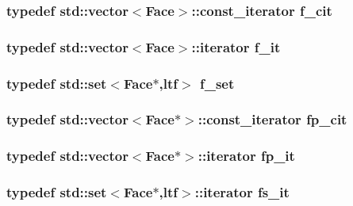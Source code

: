 \subsubsection{\setlength{\rightskip}{0pt plus 5cm}typedef std::vector$<${\bf Face}$>$::const\_\-iterator {\bf f\_\-cit}}\label{meshmorph_8h_1bdf0f72f7c8cbe704a0f6b64be07f6b}


\subsubsection{\setlength{\rightskip}{0pt plus 5cm}typedef std::vector$<${\bf Face}$>$::iterator {\bf f\_\-it}}\label{meshmorph_8h_a19fd10324725dd9216be23ee875011e}


\subsubsection{\setlength{\rightskip}{0pt plus 5cm}typedef std::set$<${\bf Face}$\ast$,{\bf ltf}$>$ {\bf f\_\-set}}\label{meshmorph_8h_18c3a5c9149f71028e8356a5f59979c1}


\subsubsection{\setlength{\rightskip}{0pt plus 5cm}typedef std::vector$<${\bf Face}$\ast$$>$::const\_\-iterator {\bf fp\_\-cit}}\label{meshmorph_8h_8d2bcc70fbd9a2cca7eecb128703e8c7}


\subsubsection{\setlength{\rightskip}{0pt plus 5cm}typedef std::vector$<${\bf Face}$\ast$$>$::iterator {\bf fp\_\-it}}\label{meshmorph_8h_c65901c49115edae93d689df5a5e2078}


\subsubsection{\setlength{\rightskip}{0pt plus 5cm}typedef std::set$<${\bf Face}$\ast$,{\bf ltf}$>$::iterator {\bf fs\_\-it}}\label{meshmorph_8h_ac3d66c96f82288309b43040bf91b2d0}


